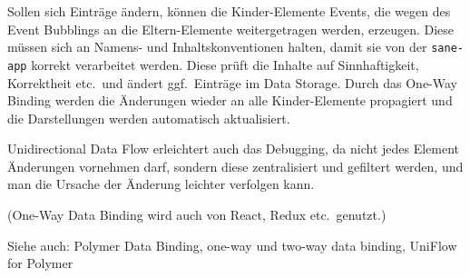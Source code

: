\documentclass{scrartcl}
\begin{document}
Sollen sich Einträge ändern, können die Kinder-Elemente Events, die wegen des Event Bubblings an die Eltern-Elemente weitergetragen werden, erzeugen.
Diese müssen sich an Namens- und Inhaltskonventionen halten, damit sie von der \texttt{sane-app} korrekt verarbeitet werden.
Diese prüft die Inhalte auf Sinnhaftigkeit, Korrektheit etc.\ und ändert ggf.\ Einträge im Data Storage.
Durch das One-Way Binding werden die Änderungen wieder an alle Kinder-Elemente propagiert und die Darstellungen werden automatisch aktualisiert.

Unidirectional Data Flow erleichtert auch das Debugging, da nicht jedes Element Änderungen vornehmen darf, sondern diese zentralisiert und gefiltert werden, und man die Ursache der Änderung leichter verfolgen kann.

(One-Way Data Binding wird auch von React, Redux etc.\ genutzt.)

Siehe auch: Polymer Data Binding, one-way und two-way data binding, UniFlow for Polymer
\end{document}

